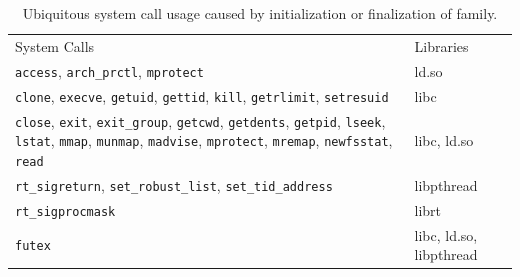 \begin{table}[t]
\centering
\small
\begin{tabular}{>{\footnotesize\raggedright\arraybackslash}m{4.8in}>{\raggedright\arraybackslash}m{1.3in}}
\hline
\addlinespace
System Calls & Libraries \\
\addlinespace
\hline
{\tt access}, {\tt arch\_prctl}, {\tt mprotect} & ld.so \\
\hline
{\tt clone}, {\tt execve}, {\tt getuid}, {\tt gettid},
{\tt kill}, {\tt getrlimit}, {\tt setresuid} & libc \\
\hline
{\tt close}, {\tt exit}, {\tt exit\_group}, {\tt getcwd},
{\tt getdents}, {\tt getpid}, {\tt lseek}, {\tt lstat},
{\tt mmap}, {\tt munmap}, {\tt madvise}, {\tt mprotect},
{\tt mremap}, {\tt newfsstat}, {\tt read} &
libc, ld.so \\
\hline
{\tt rt\_sigreturn}, {\tt set\_robust\_list}, {\tt set\_tid\_address} &
libpthread \\
\hline
{\tt rt\_sigprocmask} &
librt \\
\hline
{\tt futex} &
libc, ld.so, libpthread \\
\hline
\end{tabular}
\footnotesize
\caption{Ubiquitous system call usage caused by initialization or finalization of \libc{} family.}
\label{table:libc-init-call}
\end{table}
